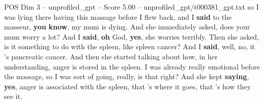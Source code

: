 \begin{textsample}{POS Dim 3 – unprofiled\_gpt – Score 5.00 – unprofiled\_gpt/t000381\_gpt.txt}  \label{ex:f3_pos_036}
so I was lying there having this massage before I flew back, and I \textbf{said} to the masseur, \textbf{you} \textbf{know}, my mum is dying.
And she immediately asked, does your mum worry a lot?
And I \textbf{said}, \textbf{oh} God, \textbf{yes}, she worries terribly.
Then she asked, is it something to do with the spleen, like spleen cancer?
And I \textbf{said}, well, no, it ’s pancreatic cancer.
And then she started talking about how, in her understanding, anger is stored in the spleen.
I was already really emotional before the massage, so I was sort of going, really, is that right?
And she kept \textbf{saying}, \textbf{yes}, anger is associated with the spleen, that ’s where it goes, that ’s how they see it.

\end{textsample}
